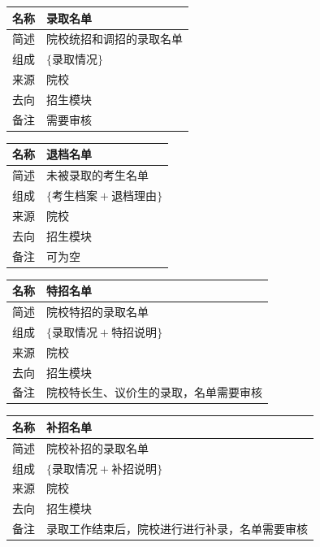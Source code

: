 \documentclass[CJK,utf8]{ctexrep}
\begin{document}
\begin{tabularx}{0.85\textwidth}{|l|X|}
	\hline
	\textbf{名称} & \textbf{录取名单} \\
	\hline
	简述 & 院校统招和调招的录取名单 \\
	\hline
	组成 & $\lbrace\text{录取情况}\rbrace$ \\
	\hline
	来源 & 院校 \\
	\hline
	去向 & 招生模块 \\
	\hline
	备注 & 需要审核 \\
	\hline
\end{tabularx}

\begin{tabularx}{0.85\textwidth}{|l|X|}
	\hline
	\textbf{名称} & \textbf{退档名单} \\
	\hline
	简述 & 未被录取的考生名单 \\
	\hline
	组成 & $\lbrace\text{考生档案}+\text{退档理由}\rbrace$ \\
	\hline
	来源 & 院校 \\
	\hline
	去向 & 招生模块 \\
	\hline
	备注 & 可为空 \\
	\hline
\end{tabularx}

\begin{tabularx}{0.85\textwidth}{|l|X|}
	\hline
	\textbf{名称} & \textbf{特招名单} \\
	\hline
	简述 & 院校特招的录取名单 \\
	\hline
	组成 & $\lbrace\text{录取情况}+\text{特招说明}\rbrace$ \\
	\hline
	来源 & 院校 \\
	\hline
	去向 & 招生模块 \\
	\hline
	备注 & 院校特长生、议价生的录取，名单需要审核 \\
	\hline
\end{tabularx}

\begin{tabularx}{0.85\textwidth}{|l|X|}
	\hline
	\textbf{名称} & \textbf{补招名单} \\
	\hline
	简述 & 院校补招的录取名单 \\
	\hline
	组成 & $\lbrace\text{录取情况}+\text{补招说明}\rbrace$ \\
	\hline
	来源 & 院校 \\
	\hline
	去向 & 招生模块 \\
	\hline
	备注 & 录取工作结束后，院校进行进行补录，名单需要审核 \\
	\hline
\end{tabularx}
\end{document}
